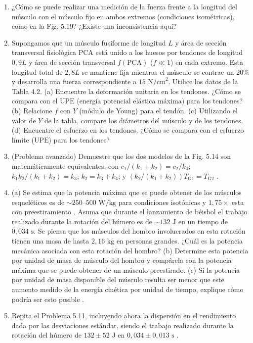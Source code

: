 \documentclass[12pt]{book}
\begin{document}
\begin{enumerate}
\item[5.8] ¿Cómo se puede realizar una medición de la fuerza frente a la longitud del músculo con el músculo fijo en ambos extremos (condiciones isométricas), como en la Fig. 5.19? ¿Existe una inconsistencia aquí?

\item[5.9] Supongamos que un músculo fusiforme de longitud $L$ y área de sección transversal fisiológica $\text{PCA}$ está unido a los huesos por tendones de longitud $0{,}9 L$ y área de sección transversal $f(\text{PCA})$ ($f \ll 1$) en cada extremo. Esta longitud total de $2{,}8 L$ se mantiene fija mientras el músculo se contrae un $20\%$ y desarrolla una fuerza correspondiente a $15\text{ N/cm}^2$. Utilice los datos de la Tabla 4.2. (a) Encuentre la deformación unitaria en los tendones. ¿Cómo se compara con el $\text{UPE}$ (energía potencial elástica máxima) para los tendones? (b) Relacione $f$ con $Y$ (módulo de Young) para el tendón. (c) Utilizando el valor de $Y$ de la tabla, compare los diámetros del músculo y de los tendones. (d) Encuentre el esfuerzo en los tendones. ¿Cómo se compara con el esfuerzo límite ($\text{UPE}$) para los tendones?

\item[5.10] (Problema avanzado) Demuestre que los dos modelos de la Fig. 5.14 son matemáticamente equivalentes, con $c_1/(k_1 + k_2) = c_2/k_4$; $k_1 k_2/(k_1 + k_2) = k_3$; $k_2 = k_3 + k_4$; y $(k_2/(k_1 + k_2)) T_{\text{G1}} = T_{\text{G2}}$ \cite{53}.

\item[5.11] (a) Se estima que la potencia máxima que se puede obtener de los músculos esqueléticos es de $\sim 250\text{--}500\text{ W/kg}$ para condiciones isotónicas y $1{,}75\times$ esta con preestiramiento \cite{25}. Asuma que durante el lanzamiento de béisbol el trabajo realizado durante la rotación del húmero es de $\sim 132\text{ J}$ en un tiempo de $0{,}034\text{ s}$. Se piensa que los músculos del hombro involucrados en esta rotación tienen una masa de hasta $2{,}16\text{ kg}$ en personas grandes. ¿Cuál es la potencia mecánica asociada con esta rotación del hombro?
(b) Determine esta potencia por unidad de masa de músculo del hombro y compárela con la potencia máxima que se puede obtener de un músculo preestirado.
(c) Si la potencia por unidad de masa disponible del músculo resulta ser menor que este aumento medido de la energía cinética por unidad de tiempo, explique cómo podría ser esto posible \cite{63}.

\item[5.12] Repita el Problema 5.11, incluyendo ahora la dispersión en el rendimiento dada por las desviaciones estándar, siendo el trabajo realizado durante la rotación del húmero de $132 \pm 52\text{ J}$ en $0{,}034 \pm 0{,}013\text{ s}$ \cite{63}.


\end{enumerate}
\end{document}
